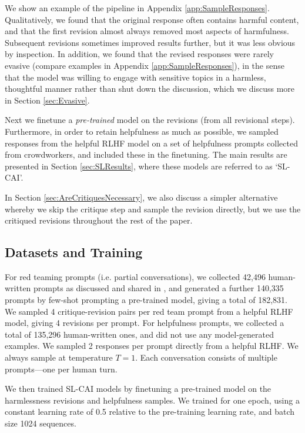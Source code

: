 \documentclass[english]{article}
\renewcommand\>{\rangle}
\begin{document}
We show an example of the pipeline in Appendix \ref{app:SampleResponses}. Qualitatively, we found that the original response often contains harmful content, and that the first revision almost always removed most aspects of harmfulness. Subsequent revisions sometimes improved results further, but it was less obvious by inspection. In addition, we found that the revised responses were rarely evasive (compare examples in Appendix \ref{app:SampleResponses}), in the sense that the model was willing to engage with sensitive topics in a harmless, thoughtful manner rather than shut down the discussion, which we discuss more in Section \ref{sec:Evasive}.

Next we finetune a {\it pre-trained} model on the revisions (from all revisional steps). Furthermore, in order to retain helpfulness as much as possible, we sampled responses from the helpful RLHF model on a set of helpfulness prompts collected from crowdworkers, and included these in the finetuning. The main results are presented in Section \ref{sec:SLResults}, where these models are referred to as `SL-CAI'.

In Section \ref{sec:AreCritiquesNecessary}, we also discuss a simpler alternative whereby we skip the critique step and sample the revision directly, but we use the critiqued revisions throughout the rest of the paper.


\subsection{Datasets and Training}
\label{sec:SLCAIDatasets}

For red teaming prompts (i.e. partial conversations), we collected 42,496 human-written prompts as discussed and shared in \cite{DeepRedTeaming}, and generated a further 140,335 prompts by few-shot prompting a pre-trained model, giving a total of 182,831. We sampled 4 critique-revision pairs per red team prompt from a helpful RLHF model, giving 4 revisions per prompt. For helpfulness prompts, we collected a total of 135,296 human-written ones, and did not use any model-generated examples. We sampled 2 responses per prompt directly from a helpful RLHF. We always sample at temperature $T=1$. Each conversation consists of multiple prompts---one per human turn.


We then trained SL-CAI models by finetuning a pre-trained model on the harmlessness revisions and helpfulness samples. We trained for one epoch, using a constant learning rate of 0.5 relative to the pre-training learning rate, and batch size 1024 sequences.
\end{document}
